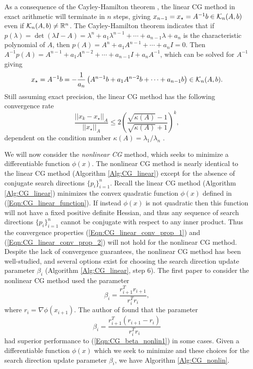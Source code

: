 \begin{enumerate}
As a consequence of the Cayley-Hamilton theorem \cite[Chapter 12, Proposition 20]{dummit2004abstract}, the linear CG method in exact arithmetic will terminate in $n$ steps, giving $x_{n-1} = x_\star = A^{-1}b \in {\mathcal K}_{n}(A,b)$ even if ${\mathcal K}_{n}(A,b) \neq {\mathbb R}^n$.  
The Cayley-Hamilton theorem indicates that if $p(\lambda) = \det(\lambda I - A) = \lambda^n + a_1 \lambda^{n-1} + \cdots + a_{n-1}\lambda + a_n$ is the characteristic polynomial of $A$, then $p(A) = A^n + a_1 A^{n-1} + \cdots + a_nI = 0$.  
Then $A^{-1}p(A) = A^{n-1} + a_1 A^{n-2} + \cdots + a_{n-1}I + a_nA^{-1}$, which can be solved for $A^{-1}$ giving
\begin{equation}   	\label{Eqn:CG_linear_conv_prop_1}
x_\star = A^{-1}b =  - \frac{1}{a_n} \left( A^{n-1}b + a_1A^{n-2}b + \cdots + a_{n-1}b \right) \in {\mathcal K}_{n}(A,b).
\end{equation}
Still assuming exact precision, the linear CG method has the following convergence rate
\begin{equation}		\label{Eqn:CG_linear_conv_prop_2}
\frac{||x_k - x_\star||_A}{||x_\star||_A} \leq 2  \left( \frac{\sqrt{\kappa(A)} - 1}{\sqrt{\kappa(A)} + 1} \right)^k,
\end{equation}
dependent on the condition number $\kappa (A)= \lambda_1 / \lambda_n$ \cite[Theorem 38.5]{trefethen1997numerical}.




We will now consider the \textit{nonlinear CG} method, which seeks to minimize a differentiable function $\phi(x)$.
The nonlinear CG method is nearly identical to the linear CG method (Algorithm \ref{Alg:CG_linear}) except for the absence of conjugate search directions $\{p_i\}_{i=1}^n$.
Recall the linear CG method (Algorithm \ref{Alg:CG_linear}) minimizes the convex quadratic function $\phi(x)$ defined in (\ref{Eqn:CG_linear_function}).  
If instead $\phi(x)$ is not quadratic then this function will not have a fixed positive definite Hessian, and thus any sequence of search directions $\{p_i\}_{i=1}^n$ cannot be conjugate with respect to any inner product.  
Thus the convergence properties (\ref{Eqn:CG_linear_conv_prop_1}) and (\ref{Eqn:CG_linear_conv_prop_2}) will not hold for the nonlinear CG method.  
Despite the lack of convergence guarantees, the nonlinear CG method has been well-studied, and several options exist for choosing the search direction update parameter $\beta_i$ (Algorithm \ref{Alg:CG_linear}, step 6).
The first paper to consider the nonlinear CG method \cite{fletcher1964function} used the parameter
\begin{equation}		\label{Eqn:CG_beta_nonlin1}
\beta_i = \frac{r_{i+1}^Tr_{i+1}}{r_i^Tr_i},
\end{equation} 
where $r_i = \nabla \phi(x_{i+1})$.  The author of \cite{polak1969note} found that the parameter
\begin{equation} 		\label{Eqn:CG_beta_nonlin2}
\beta_i = \frac{r_{i+1}^T(r_{i+1}-r_i)}{r_i^Tr_i}
\end{equation}
had superior performance to (\ref{Eqn:CG_beta_nonlin1}) in some cases.
Given a differentiable function $\phi(x)$ which we seek to minimize and these choices for the search direction update parameter $\beta_i$, we have Algorithm \ref{Alg:CG_nonlin}.



\end{enumerate}
